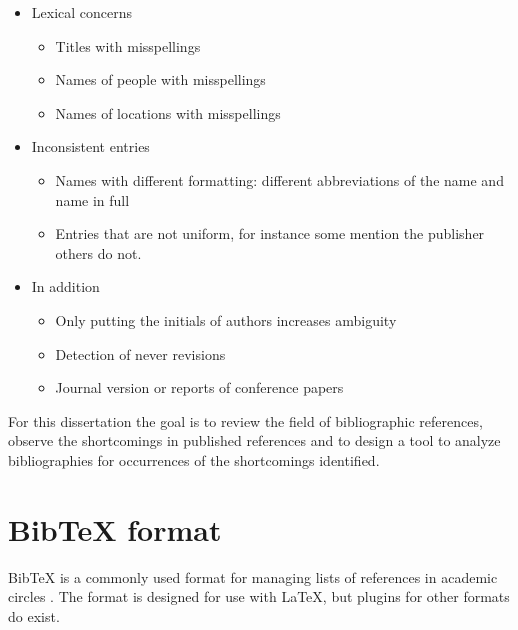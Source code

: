 
\begin{itemize}
\item Lexical concerns
  \begin{itemize}
  \item Titles with misspellings
  \item Names of people with misspellings
  \item Names of locations with misspellings
  \end{itemize}
\item Inconsistent entries
  \begin{itemize}
  \item Names with different formatting: different abbreviations of
    the name and name in full
  \item Entries that are not uniform, for instance some mention the
    publisher others do not.
  \end{itemize}
\item In addition
  \begin{itemize}
  \item Only putting the initials of authors increases ambiguity
  \item Detection of never revisions
  \item Journal version or reports of conference papers
  \end{itemize}
\end{itemize}

For this dissertation the goal is to review the field of bibliographic
references, observe the shortcomings in published references and to
design a tool to analyze bibliographies for occurrences of the
shortcomings identified.


\section{Bib{\TeX} format}
Bib{\TeX} is a commonly used format for managing lists of references in
academic circles .  The format is
designed for use with {\LaTeX}, but plugins for other formats do
exist. \autocite{bibtex_resource}

